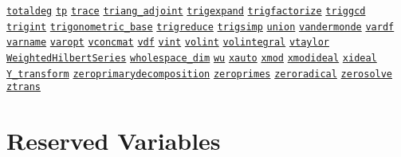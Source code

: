 \begin{list}{}
\hyperlink{operator:TOTALDEG}{\texttt{totaldeg}}
\hyperlink{operator:TP}{\texttt{tp}}
\hyperlink{operator:TRACE}{\texttt{trace}}
\hyperlink{operator:TRIANG_ADJOINT}{\texttt{triang\_adjoint}}
\hyperlink{operator:TRIGEXPAND}{\texttt{trigexpand}}
\hyperlink{operator:TRIGFACTORIZE}{\texttt{trigfactorize}}
\hyperlink{operator:TRIGGCD}{\texttt{triggcd}}
\hyperlink{operator:TRIGINT}{\texttt{trigint}}
\hyperlink{procedure:TRIGONOMETRIC_BASE}{\texttt{trigonometric\_base}}
\hyperlink{operator:TRIGREDUCE}{\texttt{trigreduce}}
\hyperlink{operator:TRIGSIMP}{\texttt{trigsimp}}
\hyperlink{operator:UNION}{\texttt{union}}
\hyperlink{operator:VANDERMONDE}{\texttt{vandermonde}}
\hyperlink{operator:VARDF}{\texttt{vardf}}
\hyperlink{operator:VARNAME}{\texttt{varname}}
\hyperlink{operator:VAROPT}{\texttt{varopt}}
\hyperlink{operator:VCONCMAT}{\texttt{vconcmat}}
\hyperlink{operator:VDF}{\texttt{vdf}}
\hyperlink{operator:VINT}{\texttt{vint}}
\hyperlink{operator:VOLINT}{\texttt{volint}}
\hyperlink{operator:VOLINTEGRAL}{\texttt{volintegral}}
\hyperlink{operator:VTAYLOR}{\texttt{vtaylor}}
\hyperlink{operator:WEIGHTEDHILBERTSERIES}{\texttt{WeightedHilbertSeries}}
\hyperlink{operator:WHOLESPACE_DIM}{\texttt{wholespace\_dim}}
\hyperlink{operator:WU}{\texttt{wu}}
\hyperlink{operator:XAUTO}{\texttt{xauto}}
\hyperlink{operator:XMOD}{\texttt{xmod}}
\hyperlink{operator:XMODIDEAL}{\texttt{xmodideal}}
\hyperlink{operator:XIDEAL}{\texttt{xideal}}
\hyperlink{operator:Y_TRANSFORM}{\texttt{Y\_transform}}
\hyperlink{operator:ZEROPRIMARYDECOMPOSITION}{\texttt{zeroprimarydecomposition}}
\hyperlink{operator:ZEROPRIMES}{\texttt{zeroprimes}}
\hyperlink{operator:ZERORADICAL}{\texttt{zeroradical}}
\hyperlink{operator:ZEROSOLVE}{\texttt{zerosolve}}
\hyperlink{operator:ZTRANS}{\texttt{ztrans}}
\halfinterwordspace

\section{Reserved Variables}


\end{list}
